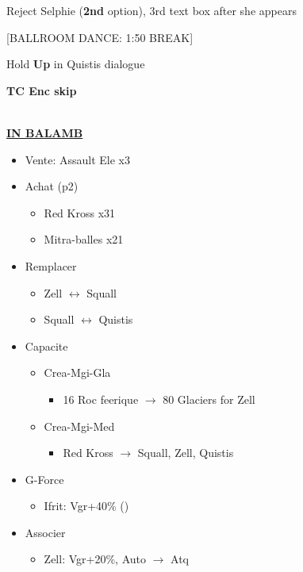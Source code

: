 Reject Selphie (\textbf{2nd} option), 3rd text box after she appears

[BALLROOM DANCE: 1:50 BREAK]

Hold \textbf{Up} in Quistis dialogue

\textbf{TC Enc skip}

\leavevmode\\
\underline{\textbf{IN BALAMB}}

\begin{shop}
	\begin{itemize}
		\item Vente: Assault Ele x3
		\item Achat (p2)
			\begin{itemize}
				\item Red Kross x31
				\item Mitra-balles x21
			\end{itemize}
	\end{itemize}
\end{shop}

\begin{menu}
	\begin{itemize}
		\item Remplacer
			\begin{itemize}
				\item Zell $\leftrightarrow$ Squall
				\item Squall $\leftrightarrow$ Quistis
			\end{itemize}
		\item Capacite
			\begin{itemize}
				\item Crea-Mgi-Gla
					\begin{itemize}
						\item 16 Roc feerique $\rightarrow$ 80 Glaciers for Zell
					\end{itemize}					 
				\item Crea-Mgi-Med
					\begin{itemize}
						\item Red Kross $\rightarrow$ Squall, Zell, Quistis
					\end{itemize}	
			\end{itemize}
		\item G-Force
			\begin{itemize}
				\item Ifrit: Vgr+40\% ()
			\end{itemize}
		\item Associer
			\begin{itemize}
				\item Zell: Vgr+20\%, Auto $\rightarrow$ Atq
			\end{itemize}
	\end{itemize}
\end{menu}

